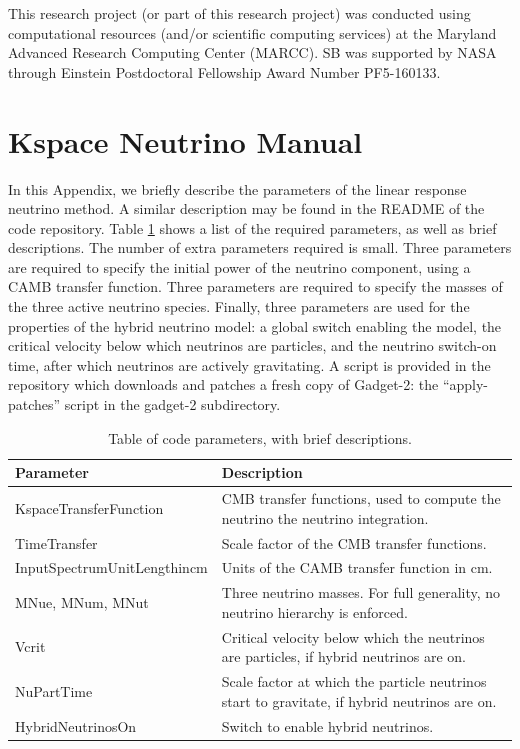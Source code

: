 \documentclass[useAMS, usenatbib]{mnras}
\begin{document}
This research project (or part of this research project) was conducted using computational resources (and/or scientific computing services) at the Maryland Advanced Research Computing Center (MARCC).
SB was supported by NASA through Einstein Postdoctoral Fellowship Award Number PF5-160133.

\appendix

\section{Kspace Neutrino Manual}
\label{sec:manual}

In this Appendix, we briefly describe the parameters of the linear response neutrino method. A similar description may be found in the README of the code repository. Table \ref{tab:parameters} shows a list of the required parameters, as well as brief descriptions. The number of extra parameters required is small. Three parameters are required to specify the initial power of the neutrino component, using a CAMB transfer function. Three parameters are required to specify the masses of the three active neutrino species. Finally, three parameters are used for the properties of the hybrid neutrino model: a global switch enabling the model, the critical velocity below which neutrinos are particles, and the neutrino switch-on time, after which neutrinos are actively gravitating. A script is provided in the repository which downloads and patches a fresh copy of Gadget-2: the ``apply-patches'' script in the gadget-2 subdirectory.

\begin{table}
\begin{center}
\begin{tabular}{|l|l|}
\hline
    Parameter & Description \\
\hline
KspaceTransferFunction   & CMB transfer functions, used to compute the neutrino the neutrino integration. \\
TimeTransfer             & Scale factor of the CMB transfer functions. \\
InputSpectrumUnitLengthincm   & Units of the CAMB transfer function in cm. \\
MNue, MNum, MNut &  Three neutrino masses. For full generality, no neutrino  hierarchy is enforced. \\
Vcrit            & Critical velocity below which the neutrinos are particles, if hybrid neutrinos are on. \\
NuPartTime       & Scale factor at which the particle neutrinos start to gravitate, if hybrid neutrinos are on. \\
HybridNeutrinosOn       & Switch to enable hybrid neutrinos. \\
\hline
\end{tabular}
\end{center}
\caption{Table of code parameters, with brief descriptions.}
\label{tab:parameters}
\end{table}
\end{document}
